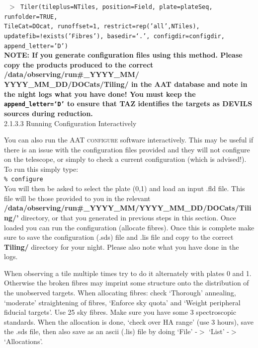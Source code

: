 \documentclass[12pt]{article}
\begin{document}
\texttt{ $>$ Tiler(tileplus=NTiles, position=Field, plate=plateSeq, runfolder=TRUE, \\ TileCat=DOcat, runoffset=1, restrict=rep('all',NTiles), \\ updatefib=!exists('Fibres'), basedir=`.', configdir=configdir, \\ append\_letter='D') }\\

\textbf{NOTE: If you generate configuration files using this method. Please copy the products produced to the correct /data/observing/run\#\_YYYY\_MM/ YYYY\_MM\_DD/DOCats/Tiling/ in the AAT database and note in the night logs what you have done! You must keep the \texttt{append\_letter=`D'} to ensure that TAZ identifies the targets as DEVILS sources during reduction.}\\


\textsf{2.1.3.3 Running Configuration Interactively}
\vspace{2mm}

You can also run the AAT \textsc{configure} software interactively. This may be useful if there is an issue with the configuration files provided and they will not configure on the telescope, or simply to check a current configuration (which is advised!). To run this simply type:\\

\hspace{15mm} \texttt{\% configure}\\

You will then be asked to select the plate (0,1) and load an input .fld file. This file will be those provided to you in the relevant \textbf{/data/observing/run\#\_YYYY\_MM/YYYY\_MM\_DD/DOCats/Tiling/'} directory, or that you generated in previous steps in this section. Once loaded you can run the configuration (allocate fibres). Once this is complete make sure to save the configuration (.sds) file and .lis file and copy to the correct \textbf{Tiling/} directory for your night. Please also note what you have done in the logs. 

When observing a tile multiple times try to do it alternately with plates 0 and 1. Otherwise the broken fibres may imprint some structure onto the distribution of the unobserved targets. When allocating fibres: check `Thorough' annealing, `moderate' straightening of fibres, `Enforce sky quota' and `Weight peripheral fiducial targets'. Use 25 sky fibres. Make sure you have some 3 spectroscopic standards. When the allocation is done, `check over HA range' (use 3 hours), save the .sds file, then also save as an ascii (.lis) file by doing `File' -$>$ `List' -$>$ `Allocations'. 
\end{document}
